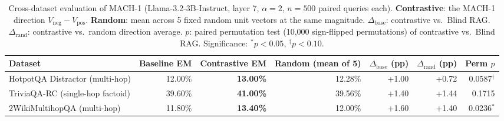 \begin{table}[htbp]
\caption{Cross-dataset evaluation of MACH-1 (Llama-3.2-3B-Instruct, layer 7, $\alpha\!=\!2$, $n\!=\!500$ paired queries each). \textbf{Contrastive}: the MACH-1 direction $V_{\text{neg}}-V_{\text{pos}}$. \textbf{Random}: mean across 5 fixed random unit vectors at the same magnitude. $\Delta_{\text{base}}$: contrastive vs.\ Blind RAG. $\Delta_{\text{rand}}$: contrastive vs.\ random direction average. $p$: paired permutation test (10{,}000 sign-flipped permutations) of contrastive vs.\ Blind RAG. Significance: $^{\ast}p<0.05$, $^{\dagger}p<0.10$.}
\label{tab:cross-dataset}
\centering\renewcommand{\arraystretch}{1.18}
\begin{tabular}{l r r r r r r}
\toprule
Dataset & Baseline EM & Contrastive EM & Random (mean of 5) & $\Delta_{\text{base}}$ (pp) & $\Delta_{\text{rand}}$ (pp) & Perm $p$ \\
\midrule
HotpotQA Distractor (multi-hop) & 12.00\% & \textbf{13.00\%} & 12.28\% & +1.00 & +0.72 & 0.0587$^{\dagger}$ \\
TriviaQA-RC (single-hop factoid) & 39.60\% & \textbf{41.00\%} & 39.56\% & +1.40 & +1.44 & 0.1715 \\
2WikiMultihopQA (multi-hop) & 11.80\% & \textbf{13.40\%} & 12.00\% & +1.60 & +1.40 & 0.0236$^{\ast}$ \\
\bottomrule\end{tabular}\end{table}
